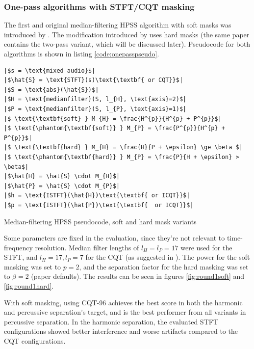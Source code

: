 \documentclass[10pt,letter]{article}
\newlength{\mintednumbersep}
\begin{document}
\subsubsection{One-pass algorithms with STFT/CQT masking}

The first and original median-filtering HPSS algorithm with soft masks was introduced by \citet{fitzgerald1}. The modification introduced by \citet{driedger} uses hard masks (the same paper contains the two-pass variant, which will be discussed later). Pseudocode for both algorithms is shown in listing \ref{code:onepasspseudo}.

\begin{listing}[h]
\setlength\partopsep{-\topsep}
\begin{verbatim}
|$s = \text{mixed audio}$|
|$\hat{S} = \text{STFT}(s)\text{\textbf{ or CQT}}$|
|$S = \text{abs}(\hat{S})$|
|$H = \text{medianfilter}(S, l_{H}, \text{axis}=2)$|
|$P = \text{medianfilter}(S, l_{P}, \text{axis}=1)$|
|$ \text{\textbf{soft} } M_{H} = \frac{H^{p}}{H^{p} + P^{p}}$|
|$ \text{\phantom{\textbf{soft}} } M_{P} = \frac{P^{p}}{H^{p} + P^{p}}$|
|$ \text{\textbf{hard} } M_{H} = \frac{H}{P + \epsilon} \ge \beta $|
|$ \text{\phantom{\textbf{hard}} } M_{P} = \frac{P}{H + \epsilon} > \beta$|
|$\hat{H} = \hat{S} \cdot M_{H}$|
|$\hat{P} = \hat{S} \cdot M_{P}$|
|$h = \text{ISTFT}(\hat{H})\text{\textbf{ or ICQT}}$|
|$p = \text{ISTFT}(\hat{P})\text{\textbf{  or ICQT}}$|
\end{verbatim}
\caption{Median-filtering HPSS pseudocode, soft and hard mask variants}
\label{code:onepasspseudo}
\end{listing}

Some parameters are fixed in the evaluation, since they're not relevant to time-frequency resolution. Median filter lengths of $l_{H} = l_{P} = 17$ were used for the STFT, and $l_{H} = 17, l_{P} = 7$ for the CQT (as suggested in \cite{fitzgerald2}). The power for the soft masking was set to $p = 2$, and the separation factor for the hard masking was set to $\beta = 2$ (paper defaults). The results can be seen in figures \ref{fig:round1soft} and \ref{fig:round1hard}.

With soft masking, using CQT-96 achieves the best score in both the harmonic and percussive separation's target, and is the best performer from all variants in percussive separation. In the harmonic separation, the evaluated STFT configurations showed better interference and worse artifacts compared to the CQT configurations.
\end{document}
